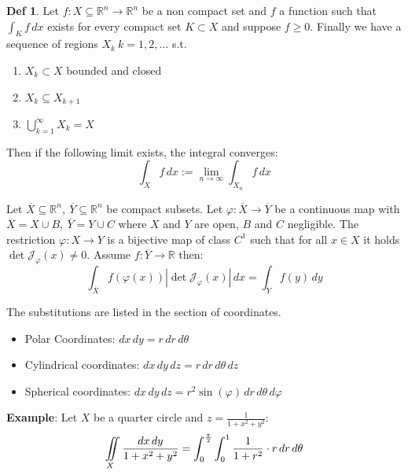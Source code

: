\documentclass[a4paper, 10pt]{article}
\theoremstyle{definition}
\newtheorem*{definition}{Def}
\newcommand{\R}{\mathbb{R}}
\newcommand{\J}{\mathcal{J}}
\begin{document}
\begin{definition}
    Let \(f: X \subseteq \R^n \to \R^n\) be a non compact set and \(f\) a function such that \(\int_K f \, dx\) exists for every compact set \(K \subset X\) and suppose \(f \geq 0\). Finally we have a sequence of regions \(X_k \ k = 1, 2, \ldots\) s.t.
    \begin{enumerate}
        \item \(X_k \subset X\) bounded and closed
        \item \(X_k \subseteq X_{k+1}\)
        \item \(\bigcup_{k=1}^\infty X_k = X\)
    \end{enumerate}
    Then if the following limit exists, the integral converges:
    \[\int_X f \, dx := \lim_{n\to\infty} \int_{X_n}f \, dx\]
\end{definition}

\begin{ntheorem*}
    Let \(\overline{X} \subseteq \R^n, \ \overline{Y} \subseteq \R^n\) be compact subsets. Let \(\varphi: \overline{X} \to \overline{Y}\) be a continuous map with \(\overline{X} = X \cup B, \ \overline{Y} = Y \cup C\) where \(X\) and \(Y\) are open, \(B\) and \(C\) negligible. The restriction \(\varphi: X \to Y\) is a bijective map of class \(C^1\) such that for all \(x \in X\) it holds \(\det \J_\varphi(x) \neq 0\). Assume \(f: \overline{Y} \to \R\) then:
    \[\int_{\overline{X}} f(\varphi(x)) \left|\det \J_\varphi(x)\right| \,dx = \int_{\overline{Y}} f(y) \,dy\]
\end{ntheorem*}

\begin{note*}
    The substitutions are listed in the section of coordinates.
    \begin{itemize}[leftmargin=15pt]
        \item Polar Coordinates: \(dx \, dy = r \, dr \, d\theta\)
        \item Cylindrical coordinates: \(dx \, dy \, dz = r \, dr \, d\theta \, dz\)
        \item Spherical coordinates: \(dx \, dy \, dz = r^2 \sin(\varphi) \, dr \, d\theta \, d\varphi\)
    \end{itemize}
    \vspace{5pt}
    \textbf{Example}: Let \(X\) be a quarter circle and \(z = \frac{1}{1 + x^2 + y^2}\):
    \[\iint\displaylimits_X \frac{dx \, dy}{1 + x^2 + y^2} = \int_0^{\frac{\pi}{2}} \int_0^1 \frac{1}{1 + r^2} \cdot r \, dr \, d\theta\]
\end{note*}
\end{document}
